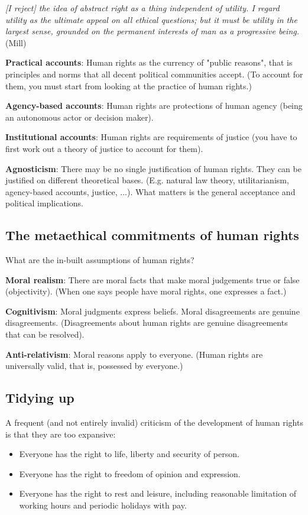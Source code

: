 \textit{[I reject] the idea of abstract right as a thing independent of
utility. I regard utility as the ultimate appeal on all ethical questions;
but it must be utility in the largest sense, grounded on the permanent
interests of man as a progressive being.} (Mill)

\textbf{Practical accounts}: Human rights as the currency of "public
reasons", that is principles and norms that all decent political communities
accept. (To account for them, you must start from looking at the practice
of human rights.)

\textbf{Agency-based accounts}: Human rights are protections of human agency
(being an autonomous actor or decision maker).

\textbf{Institutional accounts}: Human rights are requirements of justice
(you have to first work out a theory of justice to account for them).

\textbf{Agnosticism}: There may be no single justification of human rights.
They can be justified on different theoretical bases. (E.g. natural law
theory, utilitarianism, agency-based accounts, justice, ...). What matters is
the general acceptance and political implications.

\subsection{The metaethical commitments of human rights}

What are the in-built assumptions of human rights?

\textbf{Moral realism}: There are moral facts that make moral judgements true
or false (objectivity). (When one says people have moral rights, one
expresses a fact.)

\textbf{Cognitivism}: Moral judgments express beliefs. Moral disagreements are
genuine disagreements. (Disagreements about human rights are genuine
disagreements that can be resolved).

\textbf{Anti-relativism}: Moral reasons apply to everyone. (Human rights are
universally valid, that is, possessed by everyone.)

\subsection{Tidying up}

A frequent (and not entirely invalid) criticism of the development of human
rights is that they are too expansive:
\begin{itemize}
    \item Everyone has the right to life, liberty and security of person.
    \item Everyone has the right to freedom of opinion and expression.
    \item Everyone has the right to rest and leisure, including reasonable
    limitation of working hours and periodic holidays with pay.
\end{itemize}

